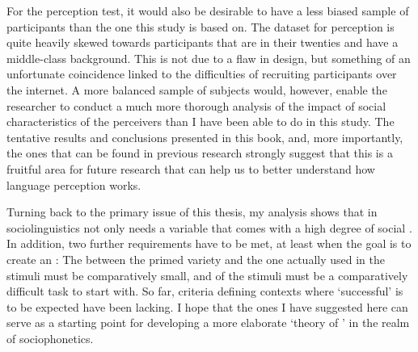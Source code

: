 For the perception test, it would also be desirable to have a less biased sample of participants than the one this study is based on.
The dataset for perception is quite heavily skewed towards participants that are in their twenties and have a middle-class background.
This is not due to a flaw in design, but something of an unfortunate coincidence linked to the difficulties of recruiting participants over the internet.
A more balanced sample of subjects would, however, enable the researcher to conduct a much more thorough analysis of the impact of social characteristics of the perceivers than I have been able to do in this study.
The tentative results and conclusions presented in this book, and, more importantly, the ones that can be found in previous research \parencite[cf.][]{hayetal2006a,haydrager2010} strongly suggest that this is a fruitful area for future research that can help us to better understand how language perception works.

Turning back to the primary issue of this thesis, my analysis shows that   in sociolinguistics not only needs a variable that comes with a high degree of social .
In addition, two further requirements have to be met, at least when the goal is to create an : 
The  between the primed variety and the one actually used in the stimuli must be comparatively small, and  of the stimuli must be a comparatively difficult task to start with.
So far, criteria defining contexts where `successful'   is to be expected have been lacking.
I hope that the ones I have suggested here can serve as a starting point for developing a more elaborate `theory of ' \parencite[cf.][]{cesario2014} in the realm of sociophonetics.